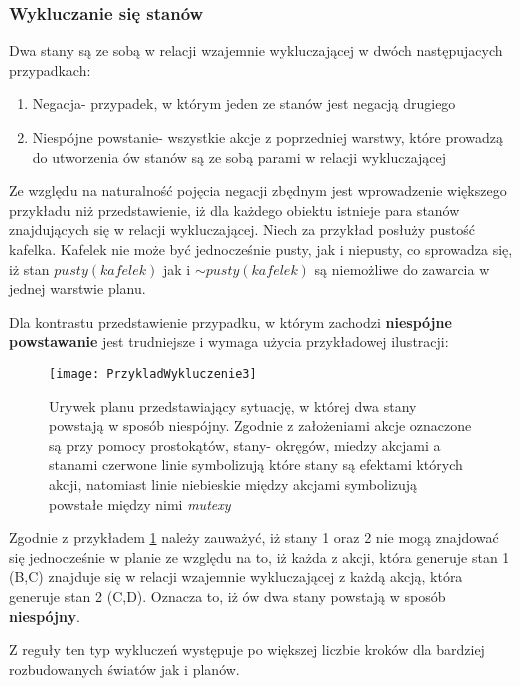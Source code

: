     \subsubsection{Wykluczanie się stanów}
    Dwa stany są ze sobą w relacji wzajemnie wykluczającej w dwóch następujacych przypadkach:
    \begin{enumerate}
        \item Negacja- przypadek, w którym jeden ze stanów jest negacją drugiego
        \item Niespójne powstanie- wszystkie akcje z poprzedniej warstwy, które prowadzą 
        do utworzenia ów stanów są ze sobą parami w relacji wykluczającej
    \end{enumerate}
    Ze względu na naturalność pojęcia negacji zbędnym jest wprowadzenie większego przykładu niż przedstawienie, iż dla każdego obiektu istnieje 
    para stanów znajdujących się w relacji wykluczającej. Niech za przykład posłuży pustość kafelka. Kafelek nie może być jednocześnie pusty, jak 
    i niepusty, co sprowadza się, iż stan $pusty(kafelek)$ jak i $\sim pusty(kafelek)$ są niemożliwe do zawarcia w jednej warstwie planu.

    Dla kontrastu przedstawienie przypadku, w którym zachodzi \textbf{niespójne powstawanie} jest trudniejsze i wymaga użycia 
    przykładowej ilustracji:

    \begin{figure}[H]
        \texttt{[image: PrzykladWykluczenie3]}
        \centering
        \caption{Urywek planu przedstawiający sytuację, w której dwa stany powstają w sposób niespójny. Zgodnie z założeniami akcje oznaczone są przy 
        pomocy prostokątów, stany- okręgów, miedzy akcjami a stanami czerwone linie symbolizują które stany są efektami których akcji, natomiast linie
        niebieskie między akcjami symbolizują powstałe między nimi \textit{mutexy}}
        \label{PrzykladWykluczenie3}
    \end{figure}

    Zgodnie z przykładem \ref{PrzykladWykluczenie3} należy zauważyć, iż stany 1 oraz 2 nie mogą 
    znajdować się jednocześnie w planie ze względu na to, iż każda z akcji, która generuje stan 1 (B,C) znajduje się w relacji 
    wzajemnie wykluczającej z każdą akcją, która generuje stan 2 (C,D). Oznacza to, iż ów dwa stany powstają w sposób \textbf{niespójny}.
    
    Z reguły ten typ wykluczeń występuje po większej liczbie kroków dla bardziej rozbudowanych światów jak i planów.
    

